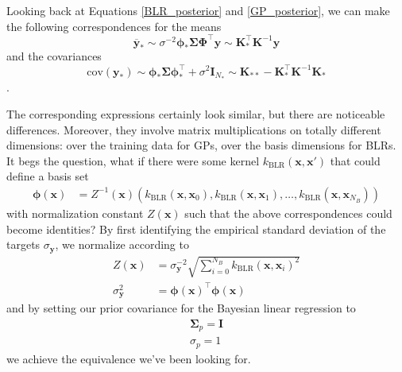 \documentclass{article}
\begin{document}
Looking back at Equations \ref{BLR_posterior} and \ref{GP_posterior}, we can make the following correspondences for the means
\begin{equation}
    \overline{\mathbf{y}}_\ast\sim\sigma^{-2}\boldsymbol{\phi}_\ast \boldsymbol{\Sigma} \boldsymbol{\Phi}^\top \mathbf{y} \sim \mathbf{K}_\ast^\top \mathbf{K}^{-1} \mathbf{y}
\end{equation}
and the covariances
\begin{equation}
   \text{cov}(\mathbf{y}_\ast) \sim \boldsymbol{\phi}_\ast\boldsymbol{\Sigma}\boldsymbol{\phi}_\ast^\top +\sigma^2 \mathbf{I}_{N_\ast}\sim \mathbf{K}_{\ast\ast} - \mathbf{K}_\ast^\top \mathbf{K}^{-1} \mathbf{K}_\ast
\end{equation}.

The corresponding expressions certainly look similar, but there are noticeable differences. Moreover, they involve matrix multiplications on totally different dimensions: over the training data for GPs, over the basis dimensions for BLRs. It begs the question, what if there were some kernel $k_\text{BLR}(\mathbf{x},\mathbf{x}')$ that could define a basis set 
\begin{equation}
\begin{split}
    \boldsymbol{\phi}(\mathbf{x})&=Z^{-1}(\mathbf{x})(k_\text{BLR}(\mathbf{x},\mathbf{x}_0),k_\text{BLR}(\mathbf{x},\mathbf{x}_1),\dots,k_\text{BLR}(\mathbf{x},\mathbf{x}_{N_B})) \end{split}
\end{equation}with normalization constant $Z(\mathbf{x})$ such that the above correspondences could become identities? By first identifying the empirical standard deviation of the targets $\sigma_\mathbf{y}$, we normalize according to
\begin{equation}
\label{eq:normalization}
\begin{split}
    Z(\mathbf{x}) &= \sigma_\mathbf{y}^{-2}\sqrt{\sum_{i=0}^{N_B}k_\text{BLR}(\mathbf{x},\mathbf{x}_i)^2} \\
    \sigma_\mathbf{y}^2 &= \boldsymbol{\phi}(\mathbf{x})^\top\boldsymbol{\phi}(\mathbf{x})
\end{split}
\end{equation}and by setting our prior covariance for the Bayesian linear regression to
\begin{equation}
\label{eq:set_sigma_p_to_one}
\begin{split}
   \boldsymbol{\Sigma}_p=\mathbf{I}\\\sigma_p=1
   \end{split}
\end{equation}we achieve the equivalence we've been looking for. 
\end{document}
